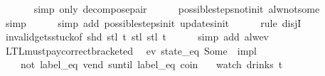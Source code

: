 \begin{isabellebody}
\isanewline
\ \ \ \ \ \isamarkupfalse%
\ {\isacharparenleft}simp\ only{\isacharcolon}\ decompose{\isacharunderscore}pair{\isacharparenright}\isanewline
\ \ \ \ \isamarkupfalse%
\ possible{\isacharunderscore}steps{\isacharunderscore}not{\isacharunderscore}init\ alw{\isacharunderscore}not{\isacharunderscore}some\isanewline
\ \ \ \ \ \isamarkupfalse%
\ simp\isanewline
\ \ \ \ \isamarkupfalse%
\ {\isacharparenleft}simp\ add{\isacharcolon}\ possible{\isacharunderscore}steps{\isacharunderscore}init\ updates{\isacharunderscore}init{\isacharparenright}\isanewline
\ \ \ \ \isamarkupfalse%
\ {\isacharparenleft}rule\ disjI{}{\isacharparenright}\isanewline
\ \ \ \ \isamarkupfalse%
\ invalid{\isacharunderscore}gets{\isacharunderscore}stuck{\isacharbrackleft}of\ {\isachardoublequoteopen}shd\ {\isacharparenleft}stl\ t{\isacharparenright}{\isachardoublequoteclose}\ {\isachardoublequoteopen}stl\ {\isacharparenleft}stl\ t{\isacharparenright}{\isachardoublequoteclose}{\isacharbrackright}\isanewline
\ \ \ \ \isamarkupfalse%
\ {\isacharparenleft}simp\ add{\isacharcolon}\ alw{\isacharunderscore}ev{\isacharparenright}\isanewline
{}\isamarkupfalse%
%
\endisatagproof
{\isafoldproof}%
%
\isadelimproof
\isanewline
%
\endisadelimproof
\isanewline
\isanewline
{}\isamarkupfalse%
\ LTL{\isacharunderscore}must{\isacharunderscore}pay{\isacharunderscore}correct{\isacharunderscore}bracketed{\isacharcolon}\isanewline
\ \ {\isachardoublequoteopen}{\isacharparenleft}{\isacharparenleft}ev\ {\isacharparenleft}state_eq\ {\isacharparenleft}Some\ {}{\isacharparenright}{\isacharparenright}{\isacharparenright}\ impl\isanewline
\ \ \ \ {\isacharparenleft}{\isacharparenleft}not\ {\isacharparenleft}label_eq\ {\isacharprime}{\isacharprime}vend{\isacharprime}{\isacharprime}{\isacharparenright}{\isacharparenright}\ suntil\ label_eq\ {\isacharprime}{\isacharprime}coin{\isacharprime}{\isacharprime}{\isacharparenright}{\isacharparenright}\isanewline
\ \ \ {\isacharparenleft}watch\ drinks\ t{\isacharparenright}{\isachardoublequoteclose}\isanewline
%
\isadelimproof
\ \ %
\endisadelimproof
%
\isatagproof
{}\isamarkupfalse%
%
\endisatagproof
{\isafoldproof}%
%
\isadelimproof
%
\endisadelimproof
%
\end{isabellebody}
